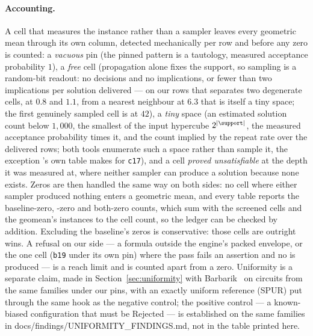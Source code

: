\paragraph{Accounting.}
A cell that measures the instance rather than a sampler leaves every geometric mean through
its own column, detected mechanically per row and before any zero is counted: a
\emph{vacuous} pin (the pinned pattern is a tautology, measured acceptance probability $1$), a
\emph{free} cell (propagation alone fixes the support, so sampling is a random-bit readout: no
decisions and no implications, or fewer than two implications per solution delivered --- on our
rows that separates two degenerate cells, at $0.8$ and $1.1$, from a nearest neighbour at $6.3$
that is itself a tiny space; the first genuinely sampled cell is at $42$), a
\emph{tiny} space (an estimated solution count below $1{,}000$, the smallest of the input
hypercube $2^{|\support|}$, the measured acceptance probability times it, and the count implied
by the repeat rate over the delivered rows; both tools enumerate such a space rather than sample
it, the exception \demotic{}'s own table makes for \texttt{c17}), and a cell \emph{proved
unsatisfiable} at the depth it was measured at, where neither sampler can produce a solution
because none exists. Zeros
are then handled the same way on both sides: no cell where either sampler produced nothing
enters a geometric mean, and every table reports the baseline-zero, \gpap{}-zero and
both-zero counts, which sum with the screened cells and the geomean's instances to the cell
count, so the ledger can be checked by addition. Excluding the baseline's zeros is
conservative: those cells are outright wins. A refusal on our side --- a formula outside the
engine's packed envelope, or the one cell (\texttt{b19} under its own pin) where the
\abctool{} pass fails an assertion and no \cnf{} is produced --- is a reach limit and is
counted apart from a zero. Uniformity is a
separate claim, made in Section~\ref{sec:uniformity} with Barbarik~\cite{barbarik} on circuits
from the same families under our pins, with an exactly uniform reference (SPUR) put through the same
hook as the negative control; the positive control --- a known-biased configuration that must be
Rejected --- is established on the same families in
docs/findings/UNIFORMITY\_FINDINGS.md, not in the table printed here.
